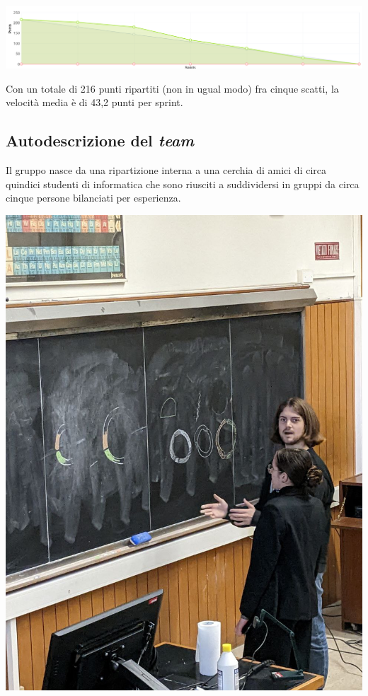 \documentclass{article}
\begin{document}
\includegraphics[width=\textwidth]{burndown.png}

Con un totale di 216 punti ripartiti (non in ugual modo) fra cinque scatti, la
velocità media è di 43,2 punti per sprint.

\subsection{Autodescrizione del \emph{team}}

Il gruppo nasce da una ripartizione interna a una cerchia di amici di circa
quindici studenti di informatica che sono riusciti a suddividersi in gruppi da
circa cinque persone bilanciati per esperienza.

\includegraphics[width=\textwidth]{ui-team.jpg}
\end{document}
